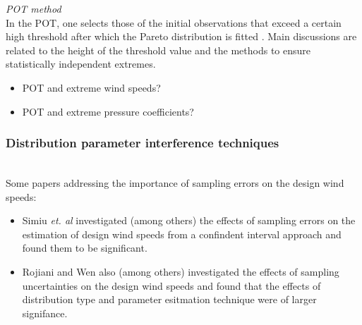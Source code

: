 \documentclass[fleqn]{article}
\begin{document}
\textit{POT method}\\
In the POT, one selects those of the initial observations that exceed a certain high threshold after which the
Pareto distribution is fitted \cite{Pickands_1975}. Main discussions are related to the height of the threshold value and the methods to ensure statistically independent extremes. 
\begin{itemize}
\item POT and extreme wind speeds?
\item POT and extreme pressure coefficients?
\end{itemize}

\subsubsection{Distribution parameter interference techniques}
\\
Some papers addressing the importance of sampling errors on the design wind speeds:
\begin{itemize}
\item Simiu \textit{et. al} \cite{Simiu_1978} investigated (among others) the effects of sampling errors on the estimation of design wind speeds from a confindent interval approach and found them to be significant.
\item 
Rojiani and Wen \cite{Rojiani_1980} also (among others) investigated the effects of sampling uncertainties on the design wind speeds and found that the effects of distribution type and parameter esitmation technique were of larger signifance. 
\end{itemize}
\end{document}
